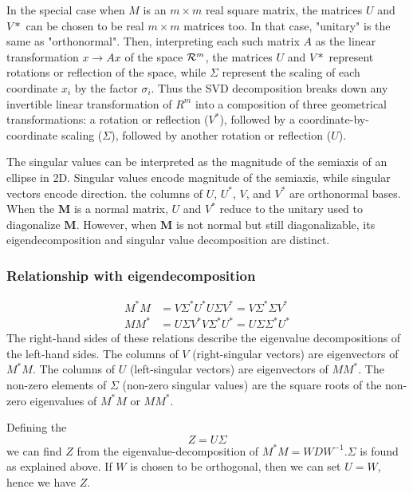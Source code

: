 In the special case when $M$ is an $m \times m$ real square matrix, the matrices $U$ and $V*$ can be chosen to be real $m \times m$ matrices too. In that case, "unitary" is the same as "orthonormal". Then, interpreting each such matrix $A$ as the linear transformation $x \rightarrow Ax$ of the space $\CMcal{R}^m$, the matrices $U$ and $V*$ represent rotations or reflection of the space, while $\Sigma$ represent the scaling of each coordinate $x_i$ by the factor $\sigma_i$. Thus the SVD decomposition breaks down any invertible linear transformation of $R^m$ into a composition of three geometrical transformations: a rotation or reflection ($V^*$), followed by a coordinate-by-coordinate scaling ($\Sigma$), followed by another rotation or reflection ($U$).

The singular values can be interpreted as the magnitude of the semiaxis of an ellipse in 2D. Singular values encode magnitude of the semiaxis, while singular vectors encode direction. the columns of $U$, $U^*$, $V$, and $V^*$ are orthonormal bases. When the $\mathbf {M}$ is a normal matrix, $U$ and $V^*$ reduce to the unitary used to diagonalize $\mathbf {M}$. However, when 
$\mathbf {M}$  is not normal but still diagonalizable, its eigendecomposition and singular value decomposition are distinct.


\subsubsection{Relationship with eigendecomposition}
\label{SVDEigenDec}
\begin{equation}
\begin{aligned}
M^*M &= V \Sigma^* U^*U \Sigma V^* = V\Sigma^* \Sigma V^*\\
MM^* &= U \Sigma V^*V \Sigma^* U^* = U \Sigma \Sigma^* U^*
\end{aligned}
\end{equation}
The right-hand sides of these relations describe the eigenvalue decompositions of the left-hand sides. The columns of $V$ (right-singular vectors) are eigenvectors of $M^*M$. The columns of $U$ (left-singular vectors) are eigenvectors of $MM^*$. The non-zero elements of $\Sigma$ (non-zero singular values) are the square roots of the non-zero eigenvalues of $M^*M$ or $MM^*$.

Defining the 
\begin{equation}
Z = U\Sigma
\end{equation}
we can find $Z$ from the eigenvalue-decomposition of $M^*M = W D W^{-1}$.$\Sigma$ is found as explained above. If $W$ is chosen to be orthogonal, then we can set $U=W$, hence we have $Z$.

